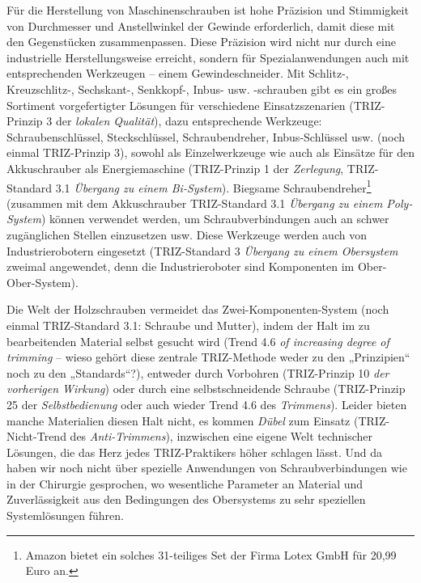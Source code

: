 \documentclass[11pt,a4paper]{article}
\begin{document}
Für die Herstellung von Maschinenschrauben ist hohe Präzision und Stimmigkeit
von Durchmesser und Anstellwinkel der Gewinde erforderlich, damit diese mit
den Gegenstücken zusammenpassen.  Diese Präzision wird nicht nur durch eine
industrielle Herstellungsweise erreicht, sondern für Spezialanwendungen auch
mit entsprechenden Werkzeugen -- einem Gewindeschneider.  Mit Schlitz-,
Kreuzschlitz-, Sechskant-, Senkkopf-, Inbus- usw. -schrauben gibt es ein
großes Sortiment vorgefertigter Lösungen für verschiedene Einsatzszenarien
(TRIZ-Prinzip 3 der \emph{lokalen Qualität}), dazu entsprechende Werkzeuge:
Schraubenschlüssel, Steckschlüssel, Schraubendreher, Inbus-Schlüssel
usw. (noch einmal TRIZ-Prinzip 3), sowohl als Einzelwerkzeuge wie auch als
Einsätze für den Akkuschrauber als Energiemaschine (TRIZ-Prinzip 1 der
\emph{Zerlegung}, TRIZ-Standard 3.1 \emph{Übergang zu einem Bi-System}).
Biegsame Schraubendreher\footnote{Amazon bietet ein solches 31-teiliges Set
  der Firma Lotex GmbH für 20,99 Euro an.} (zusammen mit dem Akkuschrauber
TRIZ-Standard 3.1 \emph{Übergang zu einem Poly-System}) können verwendet
werden, um Schraubverbindungen auch an schwer zugänglichen Stellen einzusetzen
usw.  Diese Werkzeuge werden auch von Industrierobotern eingesetzt
(TRIZ-Standard 3 \emph{Übergang zu einem Obersystem} zweimal angewendet, denn
die Industrieroboter sind Komponenten im Ober-Ober-System).

Die Welt der Holzschrauben vermeidet das Zwei-Komponenten-System (noch einmal
TRIZ-Standard 3.1: Schraube und Mutter), indem der Halt im zu bearbeitenden
Material selbst gesucht wird (Trend 4.6 \emph{of increasing degree of
  trimming} -- wieso gehört diese zentrale TRIZ-Methode weder zu den
„Prinzipien“ noch zu den „Standards“?), entweder durch Vorbohren (TRIZ-Prinzip
10 \emph{der vorherigen Wirkung}) oder durch eine selbstschneidende Schraube
(TRIZ-Prinzip 25 der \emph{Selbstbedienung} oder auch wieder Trend 4.6 des
\emph{Trimmens}). Leider bieten manche Materialien diesen Halt nicht, es
kommen \emph{Dübel} zum Einsatz (TRIZ-Nicht-Trend des \emph{Anti-Trimmens}),
inzwischen eine eigene Welt technischer Lösungen, die das Herz jedes
TRIZ-Praktikers höher schlagen lässt.  Und da haben wir noch nicht über
spezielle Anwendungen von Schraubverbindungen wie in der Chirurgie gesprochen,
wo wesentliche Parameter an Material und Zuverlässigkeit aus den Bedingungen
des Obersystems zu sehr speziellen Systemlösungen führen.
\end{document}
